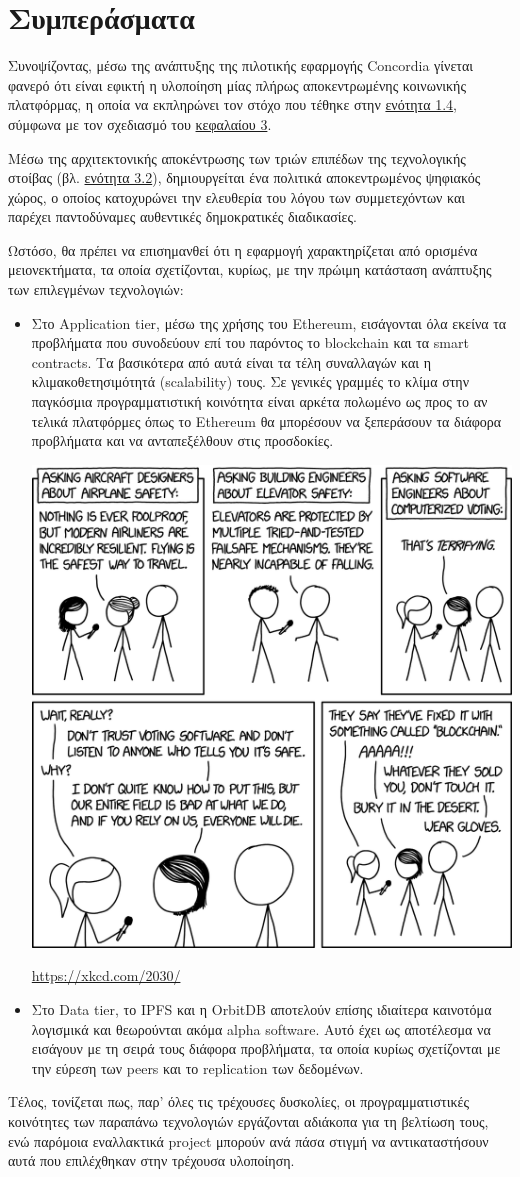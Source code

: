 \section{Συμπεράσματα}\label{section:5-1-conclusions}

Συνοψίζοντας, μέσω της ανάπτυξης της πιλοτικής εφαρμογής Concordia γίνεται φανερό ότι είναι εφικτή η υλοποίηση μίας πλήρως αποκεντρωμένης κοινωνικής πλατφόρμας, η οποία να εκπληρώνει τον στόχο που τέθηκε στην \hyperref[section:1-4-thesis-goal]{ενότητα 1.4}, σύμφωνα με τον σχεδιασμό του \hyperref[chapter:3-application-design]{κεφαλαίου 3}.

Μέσω της αρχιτεκτονικής αποκέντρωσης των τριών επιπέδων της τεχνολογικής στοίβας (βλ. \hyperref[section:3-2-technology-stack]{ενότητα 3.2}), δημιουργείται ένα πολιτικά αποκεντρωμένος ψηφιακός χώρος, ο οποίος κατοχυρώνει την ελευθερία του λόγου των συμμετεχόντων και παρέχει παντοδύναμες αυθεντικές δημοκρατικές διαδικασίες.

Ωστόσο, θα πρέπει να επισημανθεί ότι η εφαρμογή χαρακτηρίζεται από ορισμένα μειονεκτήματα, τα οποία σχετίζονται, κυρίως, με την πρώιμη κατάσταση ανάπτυξης των επιλεγμένων τεχνολογιών:

\begin{itemize}
	\item Στο Application tier, μέσω της χρήσης του Ethereum, εισάγονται όλα εκείνα τα προβλήματα που συνοδεύουν επί του παρόντος το blockchain και τα smart contracts. Τα βασικότερα από αυτά είναι τα τέλη συναλλαγών και η κλιμακοθετησιμότητά (scalability) τους. Σε γενικές γραμμές το κλίμα στην παγκόσμια προγραμματιστική κοινότητα είναι αρκέτα πολωμένο ως προς το αν τελικά πλατφόρμες όπως το Ethereum θα μπορέσουν να ξεπεράσουν τα διάφορα προβλήματα και να ανταπεξέλθουν στις προσδοκίες.

	\begin{enumitemcenteredfigure}
		\includegraphics[width=.50\textwidth]{assets/figures/chapter-5/5.1.xkcd_2030_voting_software}
		\caption{\url{https://xkcd.com/2030/}}
	\end{enumitemcenteredfigure}

	\item Στο Data tier, το IPFS και η OrbitDB αποτελούν επίσης ιδιαίτερα καινοτόμα λογισμικά και θεωρούνται ακόμα alpha software. Αυτό έχει ως αποτέλεσμα να εισάγουν με τη σειρά τους διάφορα προβλήματα, τα οποία κυρίως σχετίζονται με την εύρεση των peers και το replication των δεδομένων.
\end{itemize}

Τέλος, τονίζεται πως, παρ' όλες τις τρέχουσες δυσκολίες, οι προγραμματιστικές κοινότητες των παραπάνω τεχνολογιών εργάζονται αδιάκοπα για τη βελτίωση τους, ενώ παρόμοια εναλλακτικά project μπορούν ανά πάσα στιγμή να αντικαταστήσουν αυτά που επιλέχθηκαν στην τρέχουσα υλοποίηση.
